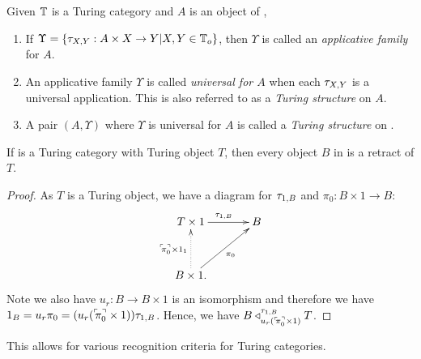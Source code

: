 \begin{definition}\label{def:turing_structure}
  Given $\mathbb{T}$ is a Turing category and $A$ is an object of \T,
  \begin{enumerate}[{(}i{)}]
    \item If $\Upsilon=\{\tau_{{X},{Y}}: A\times X \to Y | X,Y \in {\ensuremath{\mathbb{T}}}_o\}$, then $\Upsilon$ is called an
      \emph{applicative family} for $A$.
    \item An applicative family $\Upsilon$ is called \emph{universal for $A$} when each $\tau_{{X},{Y}}$ is
      a universal application. This is also referred to as a \emph{Turing structure} on $A$.
    \item A pair $(A,\Upsilon)$ where $\Upsilon$ is universal for $A$ is called a \emph{Turing
      structure} on \T.
  \end{enumerate}
\end{definition}

\begin{lemma}\label{lem:turing_object_is_retractable}
  If \T is a Turing category with Turing object $T$, then every object $B$ in \T is a retract of
  $T$.
\end{lemma}
\begin{proof}
  As $T$ is a Turing object, we have a diagram for $\tau_{{1},{B}}$ and $\pi_0:B\times 1 \to B$:
  \[
    \xymatrix@C+10pt@R+10pt{
      T\times 1 \ar[r]^{\tur{1}{B}} & B \\
      B\times 1. \ar@{.>}[u]^{\name{\pi_0}\times 1_1} \ar[ur]_{\pi_0}
    }
  \]
  Note we also have $u_r:B\to B\times 1$ is an
  isomorphism and therefore we have $1_B = u_r \pi_0 = (u_r ({}^\ulcorner\!\!\pi_0^\urcorner\times 1)) \tau_{{1},{B}}$. Hence, we
  have $B \triangleleft_{u_r ({}^\ulcorner\!\!\pi_0^\urcorner\times 1)}^{\tau_{{1},{B}}} T$.
\end{proof}

This allows for various recognition criteria for Turing categories.


